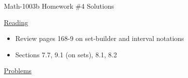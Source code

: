 \documentclass[letterpaper,12pt,fleqn]{article}
\begin{document}
\begin{center}
\Large Math-1003b Homework \#4 Solutions
\end{center}

\vspace{0.5in}

\underline{Reading}

\bigskip

\begin{itemize}
\item Review pages 168-9 on set-builder and interval notations
\item Sections 7.7, 9.1 (on sets), 8.1, 8.2
\end{itemize}

\bigskip

\underline{Problems}

\bigskip
\end{document}
